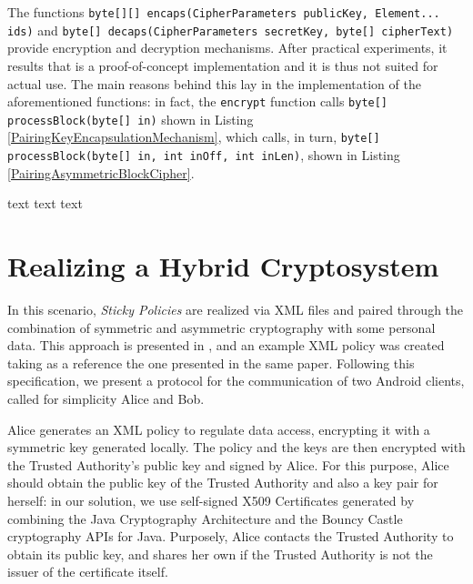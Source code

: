 The functions \texttt{byte[][] encaps(CipherParameters publicKey, Element... ids)} and \texttt{byte[] decaps(CipherParameters secretKey, byte[] cipherText)} provide encryption and decryption mechanisms. After practical experiments, it results that \cite{ISCC:DecIov11} is a proof-of-concept implementation and it is thus not suited for actual use. The main reasons behind this lay in the implementation of the aforementioned functions: in fact, the \texttt{encrypt} function calls \texttt{byte[] processBlock(byte[] in)} shown in Listing \ref{PairingKeyEncapsulationMechanism}, which calls, in turn, \texttt{byte[] processBlock(byte[] in, int inOff, int inLen)}, shown in Listing \ref{PairingAsymmetricBlockCipher}.



text text text



\section{Realizing a Hybrid Cryptosystem}
In this scenario, \textit{Sticky Policies} are realized via XML files and paired through the combination of symmetric and asymmetric cryptography with some personal data. This approach is presented in \cite{pearson2011sticky}, and an example XML policy was created taking as a reference the one presented in the same paper. Following this specification, we present a protocol for the communication of two Android clients, called for simplicity Alice and Bob. 

Alice generates an XML policy to regulate data access, encrypting it with a symmetric key generated locally. The policy and the keys are then encrypted with the Trusted Authority's public key and signed by Alice. For this purpose, Alice should obtain the public key of the Trusted Authority and also a key pair for herself: in our solution, we use self-signed X509 Certificates generated by combining the Java Cryptography Architecture and the Bouncy Castle cryptography APIs for Java. Purposely, Alice contacts the Trusted Authority to obtain its public key, and shares her own if the Trusted Authority is not the issuer of the certificate itself.

